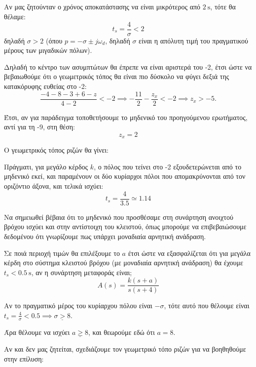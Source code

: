 \documentclass[11pt,a4paper,notitlepage,fleqn]{article}
\begin{document}
\begin{exercise}
\begin{itemize}
	\subparagraph{}
	Αν μας ζητούνταν ο χρόνος αποκατάστασης να είναι μικρότερος από \( \SI{2}{\second} \),
	τότε θα θέλαμε:
	\[
	t_s = \frac{4}{σ} < 2
	\]
	δηλαδή \( σ > 2 \) (όπου \( p=-σ\pm j\omega_d \), δηλαδή \( σ \) είναι η απόλυτη τιμή
	του πραγματικού μέρους των μιγαδικών πόλων).
	
	Δηλαδή το κέντρο των ασυμπτώτων θα έπρεπε να είναι αριστερά του -2, έτσι ώστε να
	βεβαιωθούμε ότι ο γεωμετρικός τόπος θα είναι πιο δύσκολο να φύγει δεξιά της κατακόρυφης
	ευθείας στο -2:
	\[
	\frac{-4-8-3+6-z}{4-2} < -2 \implies -\frac{11}{2}-\frac{z_x}{2} < -2
	\implies z_x > -5.
	\]
	
	Έτσι, αν για παράδειγμα τοποθετήσουμε το μηδενικό του προηγούμενου ερωτήματος, αντί
	για τη -9, στη θέση:
	\[
	z_x = 2
	\]
	
	Ο γεωμετρικός τόπος ριζών θα γίνει:
	
	Πράγματι, για μεγάλο κέρδος \( k \), ο πόλος που τείνει στο -2 εξουδετερώνεται από
	το μηδενικό εκεί, και παραμένουν οι δύο κυρίαρχοι πόλοι που απομακρύνονται από τον
	οριζόντιο άξονα, και τελικά ισχύει:
	\[
	t_s = \frac{4}{3.5} \simeq 1.14
	\]
	
	Να σημειωθεί βέβαια ότι το μηδενικό που προσθέσαμε στη συνάρτηση ανοιχτού βρόχου ισχύει
	και στην αντίστοιχη του κλειστού, όπως μπορούμε να επιβεβαιώσουμε δεδομένου ότι γνωρίζουμε
	πως υπάρχει μοναδιαία αρνητική ανάδραση.
\end{itemize}

\end{exercise}
\begin{exercise}
Σε ποιά περιοχή τιμών θα επιλέξουμε το \( a \) έτσι ώστε να εξασφαλίζεται ότι για μεγάλα
κέρδη στο σύστημα κλειστού βρόχου (με μοναδιαία αρνητική ανάδραση) θα έχουμε \( t_s <
\SI{0.5}{\second} \), αν η συνάρτηση μεταφοράς είναι;
\[
A(s) = \frac{k(s+a)}{s(s+4)}
\]

\tcblower
Αν το πραγματικό μέρος του κυρίαρχου πόλου είναι \( -σ \), τότε αυτό που θέλουμε είναι \( t_s = \frac{4}{σ} < 0.5
\implies \underline{σ > 8} \).

Άρα θέλουμε να ισχύει \( \underline{a \geq 8} \), και θεωρούμε εδώ ότι \( a=8 \).

Αν και δεν μας ζητείται, σχεδιάζουμε τον γεωμετρικό τόπο ριζών για να βοηθηθούμε στην
επίλυση:

\end{exercise}
\end{document}
